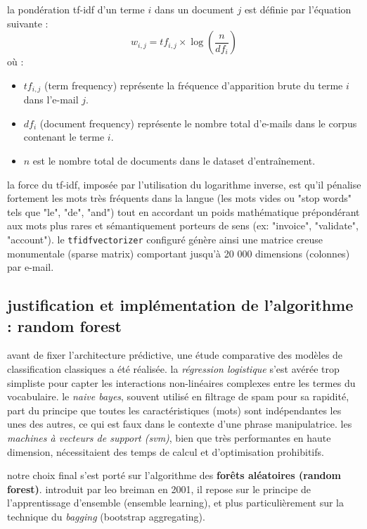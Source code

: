 \documentclass[12pt,a4paper]{report}
\begin{document}
la pondération tf-idf d'un terme $i$ dans un document $j$ est définie par l'équation suivante :
\begin{equation}
    w_{i,j} = tf_{i,j} \times \log\left(\frac{n}{df_i}\right)
\end{equation}
où :
\begin{itemize}
    \item $tf_{i,j}$ (term frequency) représente la fréquence d'apparition brute du terme $i$ dans l'e-mail $j$.
    \item $df_i$ (document frequency) représente le nombre total d'e-mails dans le corpus contenant le terme $i$.
    \item $n$ est le nombre total de documents dans le dataset d'entraînement.
\end{itemize}
la force du tf-idf, imposée par l'utilisation du logarithme inverse, est qu'il pénalise fortement les mots très fréquents dans la langue (les mots vides ou "stop words" tels que "le", "de", "and") tout en accordant un poids mathématique prépondérant aux mots plus rares et sémantiquement porteurs de sens (ex: "invoice", "validate", "account"). le \texttt{tfidfvectorizer} configuré génère ainsi une matrice creuse monumentale (sparse matrix) comportant jusqu'à 20 000 dimensions (colonnes) par e-mail.

\subsection{justification et implémentation de l'algorithme : random forest}
avant de fixer l'architecture prédictive, une étude comparative des modèles de classification classiques a été réalisée. 
la \textit{régression logistique} s'est avérée trop simpliste pour capter les interactions non-linéaires complexes entre les termes du vocabulaire. le \textit{naive bayes}, souvent utilisé en filtrage de spam pour sa rapidité, part du principe que toutes les caractéristiques (mots) sont indépendantes les unes des autres, ce qui est faux dans le contexte d'une phrase manipulatrice. les \textit{machines à vecteurs de support (svm)}, bien que très performantes en haute dimension, nécessitaient des temps de calcul et d'optimisation prohibitifs.

notre choix final s'est porté sur l'algorithme des \textbf{forêts aléatoires (random forest)}. introduit par leo breiman en 2001, il repose sur le principe de l'apprentissage d'ensemble (ensemble learning), et plus particulièrement sur la technique du \textit{bagging} (bootstrap aggregating).
\end{document}
